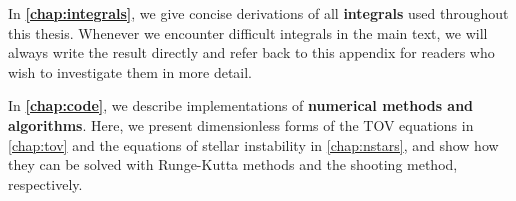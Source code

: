 In \textbf{\cref{chap:integrals}}, we give concise derivations of all \textbf{integrals} used throughout this thesis.
Whenever we encounter difficult integrals in the main text, we will always write the result directly and refer back to this appendix for readers who wish to investigate them in more detail.

In \textbf{\cref{chap:code}}, we describe implementations of \textbf{numerical methods and algorithms}.
Here, we present dimensionless forms of the TOV equations in \cref{chap:tov} and the equations of stellar instability in \cref{chap:nstars}, and show how they can be solved with Runge-Kutta methods and the shooting method, respectively.

